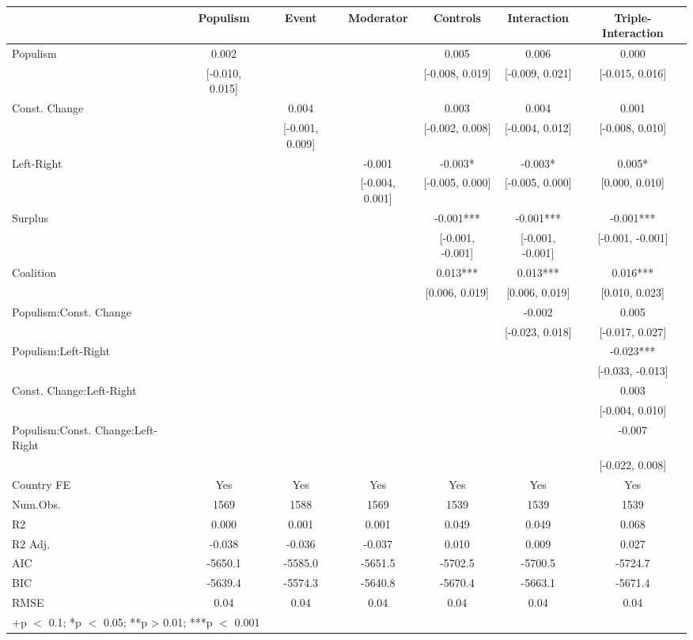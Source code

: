 \begin{table}
\centering\centering\centering
\begin{tabular}[t]{lcccccc}
\toprule
  & Populism & Event & Moderator & Controls & Interaction & Triple-Interaction\\
\midrule
Populism & 0.002 &  &  & 0.005 & 0.006 & 0.000\\
 & {}[-0.010, 0.015] &  &  & {}[-0.008, 0.019] & {}[-0.009, 0.021] & {}[-0.015, 0.016]\\
Const. Change &  & 0.004 &  & 0.003 & 0.004 & 0.001\\
 &  & {}[-0.001, 0.009] &  & {}[-0.002, 0.008] & {}[-0.004, 0.012] & {}[-0.008, 0.010]\\
Left-Right &  &  & -0.001 & -0.003* & -0.003* & 0.005*\\
 &  &  & {}[-0.004, 0.001] & {}[-0.005, 0.000] & {}[-0.005, 0.000] & {}[0.000, 0.010]\\
Surplus &  &  &  & -0.001*** & -0.001*** & -0.001***\\
 &  &  &  & {}[-0.001, -0.001] & {}[-0.001, -0.001] & {}[-0.001, -0.001]\\
Coalition &  &  &  & 0.013*** & 0.013*** & 0.016***\\
 &  &  &  & {}[0.006, 0.019] & {}[0.006, 0.019] & {}[0.010, 0.023]\\
Populism:Const. Change &  &  &  &  & -0.002 & 0.005\\
 &  &  &  &  & {}[-0.023, 0.018] & {}[-0.017, 0.027]\\
Populism:Left-Right &  &  &  &  &  & -0.023***\\
 &  &  &  &  &  & {}[-0.033, -0.013]\\
Const. Change:Left-Right &  &  &  &  &  & 0.003\\
 &  &  &  &  &  & {}[-0.004, 0.010]\\
Populism:Const. Change:Left-Right &  &  &  &  &  & -0.007\\
 &  &  &  &  &  & {}[-0.022, 0.008]\\
\midrule
Country FE & Yes & Yes & Yes & Yes & Yes & Yes\\
Num.Obs. & 1569 & 1588 & 1569 & 1539 & 1539 & 1539\\
R2 & 0.000 & 0.001 & 0.001 & 0.049 & 0.049 & 0.068\\
R2 Adj. & -0.038 & -0.036 & -0.037 & 0.010 & 0.009 & 0.027\\
AIC & -5650.1 & -5585.0 & -5651.5 & -5702.5 & -5700.5 & -5724.7\\
BIC & -5639.4 & -5574.3 & -5640.8 & -5670.4 & -5663.1 & -5671.4\\
RMSE & 0.04 & 0.04 & 0.04 & 0.04 & 0.04 & 0.04\\
\bottomrule
\multicolumn{7}{l}{\rule{0pt}{1em}+p $<$ 0.1; *p $<$ 0.05; **p > 0.01; ***p $<$ 0.001}\\
\end{tabular}
\end{table}
